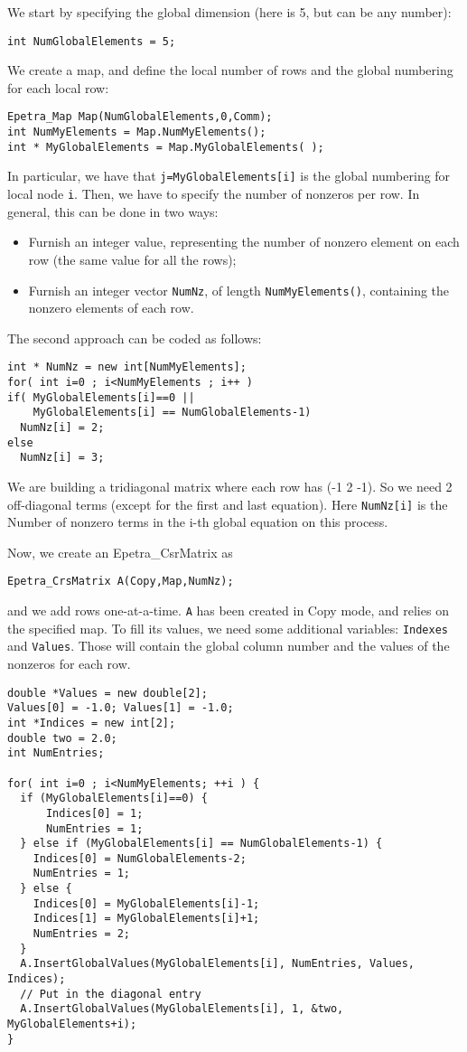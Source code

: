 We start by specifying the global dimension (here is 5, but can be any
number):
\begin{verbatim}
int NumGlobalElements = 5;
\end{verbatim}
We create a map, and define the local number of rows and the
global numbering for each local row:
\begin{verbatim}
Epetra_Map Map(NumGlobalElements,0,Comm);
int NumMyElements = Map.NumMyElements();
int * MyGlobalElements = Map.MyGlobalElements( );
\end{verbatim}
In particular, we have that \verb!j=MyGlobalElements[i]! is the global
numbering for local node \verb!i!.  Then, we have to specify the number
of nonzeros per row. In general, this can be done in two ways:
\begin{itemize}
\item Furnish an integer value, representing the number of nonzero
  element on each row (the same value for all the rows);
\item Furnish an integer vector \verb!NumNz!, of length
  \verb!NumMyElements()!, containing the nonzero elements of each row.
\end{itemize}

The second approach can be coded as follows:
\begin{verbatim}
int * NumNz = new int[NumMyElements];
for( int i=0 ; i<NumMyElements ; i++ )
if( MyGlobalElements[i]==0 || 
    MyGlobalElements[i] == NumGlobalElements-1)
  NumNz[i] = 2;
else
  NumNz[i] = 3;
\end{verbatim}
We are building a tridiagonal matrix where each row has (-1 2 -1). So we
need 2 off-diagonal terms (except for the first and last equation). Here
\verb!NumNz[i]! is the Number of nonzero terms in the i-th global
equation on this process.

Now, we create an Epetra\_CsrMatrix as
\begin{verbatim}
Epetra_CrsMatrix A(Copy,Map,NumNz);
\end{verbatim}
and we add rows one-at-a-time. \verb!A! has been created in Copy mode,
and relies on the specified map. To fill its values, we need some
additional variables: \verb!Indexes! and \verb!Values!. Those will
contain the global column number and the values of the nonzeros for each
row.
\begin{verbatim}
double *Values = new double[2];
Values[0] = -1.0; Values[1] = -1.0;
int *Indices = new int[2];
double two = 2.0;
int NumEntries;

for( int i=0 ; i<NumMyElements; ++i ) {
  if (MyGlobalElements[i]==0) {
      Indices[0] = 1;
      NumEntries = 1;
  } else if (MyGlobalElements[i] == NumGlobalElements-1) {
    Indices[0] = NumGlobalElements-2;
    NumEntries = 1;
  } else {
    Indices[0] = MyGlobalElements[i]-1;
    Indices[1] = MyGlobalElements[i]+1;
    NumEntries = 2;
  }
  A.InsertGlobalValues(MyGlobalElements[i], NumEntries, Values, Indices);
  // Put in the diagonal entry
  A.InsertGlobalValues(MyGlobalElements[i], 1, &two, MyGlobalElements+i);
}
\end{verbatim}


